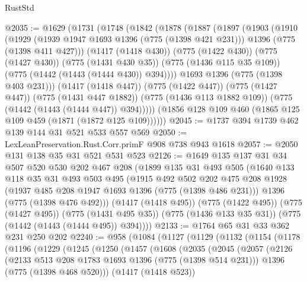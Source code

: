 \begin{lexlean}{RustStd}
\begin{coremodule}
@2035 := @1629
    (@1731
      (@1748
        (@1842
          (@1878
            (@1887
              (@1897
                (@1903
                  (@1910
                    (@1929
                      (@1939 @1947 @1693 @1396 (@775 (@1398 @421 @231)))
                      @1396
                      (@775 (@1398 @411 @427)))
                    (@1417 (@1418 @430))
                    (@775 (@1422 @430))
                    (@775 (@1427 @430))
                    (@775 (@1431 @430 @35))
                    (@775 (@1436 @115 @35 @109))
                    (@775 (@1442 (@1443 (@1444 @430)) @394))))
                @1693
                @1396
                (@775 (@1398 @403 @231)))
              (@1417 (@1418 @447))
              (@775 (@1422 @447))
              (@775 (@1427 @447))
              (@775 (@1431 @447 @1882))
              (@775 (@1436 @113 @1882 @109))
              (@775 (@1442 (@1443 (@1444 @447)) @394)))))
        (@1856 @128 @109 @460 (@1865 @125 @109 @459 (@1871 (@1872 @125 @109))))))
@2045 := @1737 @394 @1739 @462 @139 @144 @31 @521 @533 @557 @569
@2050 := LexLeanPreservation.Rust.Corr.primF @908 @738 @943 @1618
@2057 := @2050 @131 @138 @35 @31 @521 @531 @523
@2126 := @1649
    @135
    @137
    @31
    @34
    @507
    @520
    @530
    @202
    @467
    @208
    (@1899
      @135
      @31
      @493
      @505
      (@1640
        @133
        @118
        @35
        @31
        @493
        @503
        @495
        (@1915
          @492
          @502
          @202
          @475
          @208
          @1928
          (@1937 @485 @208 @1947 @1693 @1396 (@775 (@1398 @486 @231)))
          @1396
          (@775 (@1398 @476 @492)))
        (@1417 (@1418 @495))
        (@775 (@1422 @495))
        (@775 (@1427 @495))
        (@775 (@1431 @495 @35))
        (@775 (@1436 @133 @35 @31))
        (@775 (@1442 (@1443 (@1444 @495)) @394))))
@2133 := @1764 @65 @31 @33 @362 @231 @250 @202
@2240 := @958
    (@1084
      (@1127
        (@1129
          (@1132
            (@1154
              (@1178
                (@1196
                  (@1229
                    (@1245
                      (@1250
                        (@1457
                          (@1608
                            (@2035
                              (@2045
                                (@2057
                                  (@2126
                                    (@2133 @513 @208 @1783 @1693 @1396 (@775 (@1398 @514 @231)))
                                    @1396
                                    (@775 (@1398 @468 @520)))
                                  (@1417 (@1418 @523))

\end{coremodule}
\end{lexlean}
